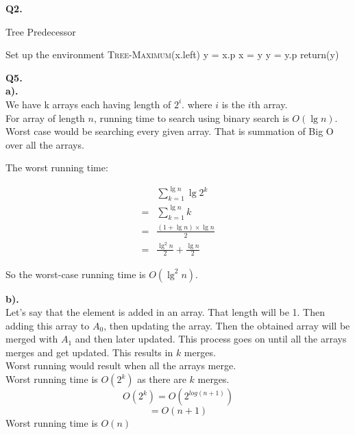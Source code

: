 \documentclass[11pt]{article}
\begin{document}
\vspace{5mm}
\hline
\vspace{5mm}
\textbf{Q2.}\\
\begin{algorithm}
\caption{Tree Predecessor}\label{euclid}
\begin{algorithmic}
\State Set up the environment
\State \textsc{Tree-Maximum}(x.left)
\EndIf
\State y = x.p
\State x = y
\State y = y.p
\EndWhile
\State return(y)
\end{algorithmic}
\end{algorithm}
\vspace{5mm}
\hline
\vspace{5mm}
\textbf{Q5.}\\
\textbf{a).}\\
We have k arrays each having length of $2^i$. where $i$ is the $i$th array.\\
For array of length $n$, running time to search using binary search is $O(\lg{n})$. Worst case would be searching every given array. That is summation of Big O over all the arrays. 

  The worst running time:
  


  \begin{equation}
    \begin{split}
      & \sum_{k=1}^{\lg{n}}{\lg{2^k}}\\
      =& \sum_{k=1}^{\lg{n}}{k}\\
      =& \frac{(1+\lg{n})\times\lg{n}}{2}\\
      =& \frac{\lg^2{n}}{2} + \frac{\lg{n}}{2}
    \end{split}
  \end{equation}

So the worst-case running time is $O(\lg^2{n})$.

\textbf{b).}\\
 Let's say that the element is added in an array. That length will be 1. Then adding this array to $A_0$, then updating the array. Then the obtained array will be merged with $A_1$ and then later updated. This process goes on until all the arrays merges and get updated. This results in $k$ merges. \\
 Worst running would result when all the arrays merge. \\
 Worst running time is $O(2^k)$ as there are $k$ merges.\\
 $$O(2^k) = O(2^{log(n+1)})$$
 $$       = O(n+1)$$
 Worst running time is $O(n)$
\end{document}
